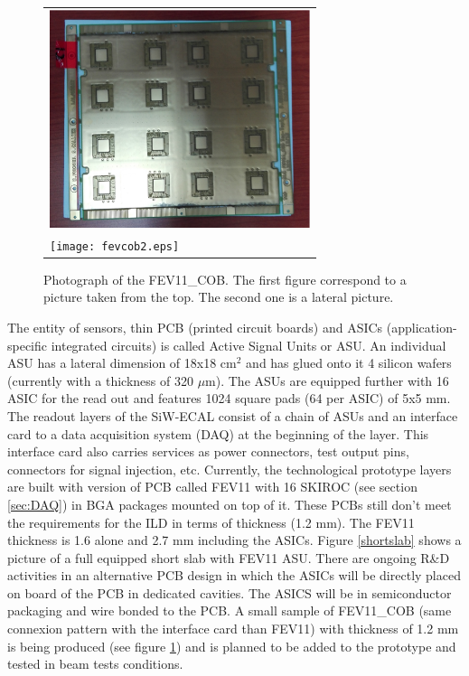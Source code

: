 \documentclass[journal]{IEEEtran}
\begin{document}
\begin{figure}[!t]
  \centering
  \begin{tabular}{l}
    \includegraphics[width=3.0in]{fevcob1.eps}\\
    \texttt{[image: fevcob2.eps]}
  \end{tabular}
\caption{Photograph of the FEV11\_COB. The first figure correspond to a picture taken from the top. The second one is a lateral picture.}
\label{fevcob}
\end{figure}

The entity
of sensors, thin PCB (printed circuit boards) and ASICs (application-specific integrated circuits) is called Active Signal Units or ASU.
An individual ASU has a lateral dimension of 18x18 cm$^{2}$ and has glued onto it 4 silicon wafers (currently with a thickness of 320 $\mu$m).
The ASUs are equipped
further with 16 ASIC for the read out and features 1024 square pads (64 per ASIC) of 5x5 mm.
The readout layers of the SiW-ECAL consist of a chain of ASUs and an interface card
to a data acquisition system (DAQ) at the beginning of the layer.
This interface card also carries services as power connectors,
test output pins, connectors for signal injection, etc. 
Currently, the technological prototype layers are built with version of PCB called FEV11 with 16 SKIROC (see section \ref{sec:DAQ})
 in BGA packages mounted on top of it.
These PCBs still don't meet the requirements
for the ILD in terms of thickness (1.2 mm). The FEV11 thickness is 1.6 alone and 2.7 mm including the ASICs.
Figure \ref{shortslab} shows a picture of a full equipped short slab with FEV11 ASU.
There are ongoing R\&D activities in an alternative PCB design in which the ASICs
will be directly placed on board of the PCB in dedicated cavities. The ASICS will be in semiconductor packaging and wire bonded to the PCB.
A small sample of FEV11\_COB (same connexion pattern with the interface card than FEV11)
with thickness of 1.2 mm is being produced (see figure \ref{fevcob})
and is planned to be added to the prototype and tested in beam tests conditions. 
\end{document}
